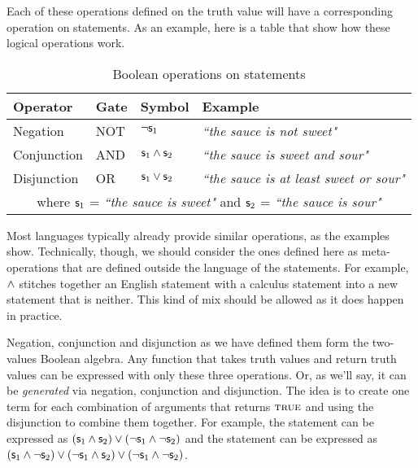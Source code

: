 \documentclass[11pt,letterpaper,fleqn]{memoir} %
\begin{document}
Each of these operations defined on the truth value will have a corresponding operation on statements. As an example, here is a table that show how these logical operations work.
\begin{table}[h]
	\centering
	\begin{tabular}{p{} p{} p{} p{}}
		Operator & Gate & Symbol & Example \\ 
		\hline 
		Negation & NOT & $\neg \mathsf{s}_1$ &  \emph{``the sauce is not sweet"} \\ 
		Conjunction & AND & $\mathsf{s}_1 \wedge \mathsf{s}_2$ & \emph{``the sauce is sweet and sour"} \\ 
		Disjunction & OR & $\mathsf{s}_1 \vee \mathsf{s}_2$ & \emph{``the sauce is at least sweet or sour"}\\
		\multicolumn{4}{c}{  where $\mathsf{s}_1$ = \emph{``the sauce is sweet"} and $\mathsf{s}_2$ = \emph{``the sauce is sour"}}
	\end{tabular} 
	\caption{Boolean operations on statements}
\end{table}

Most languages typically already provide similar operations, as the examples show. Technically, though, we should consider the ones defined here as meta-operations that are defined outside the language of the statements. For example, $\wedge$ stitches together an English statement with a calculus statement into a new statement that is neither. This kind of mix should be allowed as it does happen in practice.

Negation, conjunction and disjunction as we have defined them form the two-values Boolean algebra. Any function that takes truth values and return truth values can be expressed with only these three operations. Or, as we'll say, it can be \emph{generated} via negation, conjunction and disjunction. The idea is to create one term for each combination of arguments that returns $\textsc{true}$ and using the disjunction to combine them together. For example, the statement  can be expressed as $(\mathsf{s}_1 \wedge \mathsf{s}_2) \vee (\neg \mathsf{s}_1 \wedge \neg \mathsf{s}_2)$ and the statement  can be expressed as $(\mathsf{s}_1 \wedge \neg \mathsf{s}_2) \vee (\neg \mathsf{s}_1 \wedge \mathsf{s}_2) \vee (\neg \mathsf{s}_1 \wedge \neg \mathsf{s}_2)$.
\end{document}
